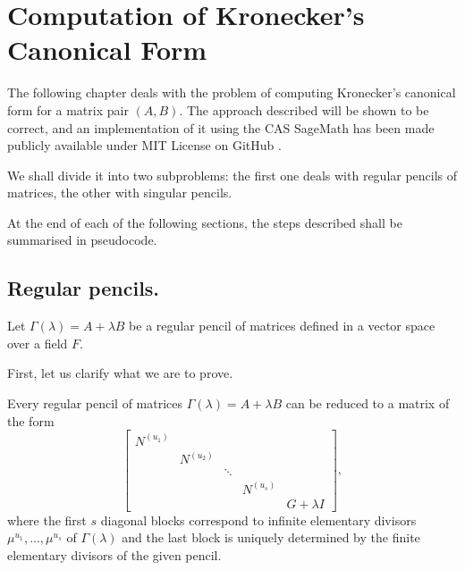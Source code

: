 \section{Computation of Kronecker's Canonical Form}
The following chapter deals with the problem of computing Kronecker's canonical form for a matrix pair \((A, B)\).
The approach described will be shown to be correct, and an implementation
of it using the CAS SageMath has been made publicly available under MIT License on GitHub
\cite{trapani-kronecker}.

We shall divide it into two subproblems: the first one deals with regular pencils of matrices, the other with
singular pencils.

At the end of each of the following sections, the steps described shall be summarised in pseudocode.

\subsection*{Regular pencils.}
Let \(\Gamma(\lambda) = A + \lambda B\) be a regular pencil of matrices defined in a vector space over a
field \(F\).

First, let us clarify what we are to prove.
\begin{theorem} \cite[p. 28, Theorem 3]{gantmacher}
    Every regular pencil of matrices \(\Gamma(\lambda) = A + \lambda B\) can be reduced to a matrix of the form
    \[
        \begin{bmatrix}
            N^{(u_{1})} \\
            & N^{(u_{2})} \\
            & & \ddots \\
            & & & N^{(u_{s})} \\
            & & & & G + \lambda I
        \end{bmatrix},
    \]
    where the first \(s\) diagonal blocks correspond to infinite elementary divisors
    \(\mu^{u_{1}}, ..., \mu^{u_{s}}\) of \(\Gamma(\lambda)\) and the last block is uniquely determined by the
    finite elementary divisors of the given pencil.
\end{theorem}

